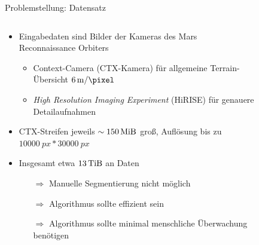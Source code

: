 \documentclass[9pt]{beamer}
\begin{document}
\begin{frame}{Problemstellung: Datensatz}
	\begin{columns}
		\begin{column}{.7\textwidth}
			\begin{itemize}
				\item Eingabedaten sind Bilder der Kameras des Mars Reconnaissance Orbiters
				\begin{itemize}
					\item \alert{Context-Camera (CTX-Kamera) für allgemeine Terrain-Übersicht $\SI{6}{\meter\per\pixel}$}
					\item \textit{High Resolution Imaging Experiment} (HiRISE) für genauere Detailaufnahmen
				\end{itemize}
				\item CTX-Streifen jeweils $\sim\SI{150}{\mebi\byte}$ groß, Auflösung bis zu $\SI{10000}{px}*\SI{30000}{px}$
				\item Insgesamt etwa $\SI{13}{\tebi\byte}$ an Daten
				\begin{itemize}
					\item[$\Rightarrow$] Manuelle Segmentierung nicht möglich
					\item[$\Rightarrow$] Algorithmus sollte effizient sein
					\item[$\Rightarrow$] Algorithmus sollte minimal menschliche Überwachung benötigen
				\end{itemize}
			\end{itemize}
		\end{column}
		\begin{column}{.3\textwidth}
			\begin{figure}[H]

\end{figure}
\end{column}
\end{columns}
\end{frame}
\end{document}
